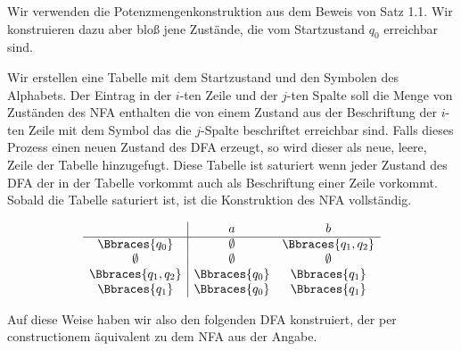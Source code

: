 \begin{solution}

Wir verwenden die Potenzmengenkonstruktion aus dem Beweis von Satz 1.1.
Wir konstruieren dazu aber bloß jene Zustände, die vom Startzustand $q_0$ erreichbar sind.

Wir erstellen eine Tabelle mit dem Startzustand und den Symbolen des Alphabets.
Der Eintrag in der $i$-ten Zeile und der $j$-ten Spalte soll die Menge von Zuständen des NFA enthalten die von einem Zustand aus der Beschriftung der $i$-ten Zeile mit dem Symbol das die $j$-Spalte beschriftet erreichbar sind.
Falls dieses Prozess einen neuen Zustand des DFA erzeugt, so wird dieser als neue, leere, Zeile der Tabelle hinzugefugt.
Diese Tabelle ist saturiert wenn jeder Zustand des DFA der in der Tabelle vorkommt auch als Beschriftung einer Zeile vorkommt.
Sobald die Tabelle saturiert ist, ist die Konstruktion des NFA vollständig.

\begin{align*}
    \begin{array}{c|cc}
                           & a             & b                  \\ \hline
        \Bbraces{q_0}      & \emptyset     & \Bbraces{q_1, q_2} \\
        \emptyset          & \emptyset     & \emptyset          \\
        \Bbraces{q_1, q_2} & \Bbraces{q_0} & \Bbraces{q_1}      \\
        \Bbraces{q_1}      & \Bbraces{q_0} & \Bbraces{q_1}
    \end{array}
\end{align*}

Auf diese Weise haben wir also den folgenden DFA konstruiert, der per constructionem äquivalent zu dem NFA aus der Angabe.

\begin{center}
\end{center}

\end{solution}

